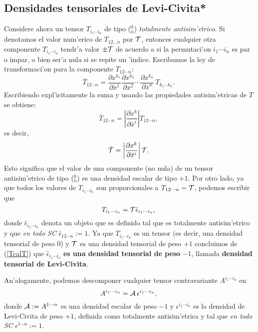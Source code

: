  \subsection{Densidades tensoriales de Levi-Civita*}
 Considere ahora un tensor $T_{i_1\cdots i_n}$ de tipo ($_n^0$)
 \textit{totalmente
 antisim'etrico}. Si denotamos el valor num'erico de $T_{12\dots n}$ por
 ${\cal T}$, entonces cualquier otra componente $T_{i_1\cdots i_n}$ tendr'a
 valor
 $\pm{\cal T}$ de acuerdo a si la permutaci'on $i_1\cdots i_n$ es par o
 impar, o
 bien ser'a nula si se repite un 'indice. Escribamos la ley de transformaci'on
 para la componente $T_{12\cdots n}$:
 \begin{equation}
 \bar{T}_{12\cdots n}=\frac{\partial
 x^{k_1}}{\partial\bar{x}^1}\frac{\partial
 x^{k_2}}{\partial\bar{x}^2}\cdots \frac{\partial x^{k_n}}{\partial\bar
 {x}^n}\,T_{k_1\cdots k_n}. \label{den8}%
 \end{equation}
 Escribiendo expl'icitamente la suma y usando las propiedades
 antisim'etricas de $T$ se obtiene:
 \begin{equation}
 \bar{T}_{12\cdots n}=\left| \frac{\partial x^k }{\partial\bar{x}^i }\right|
 T_{12\cdots n}, \label{den9}%
 \end{equation}
 es decir,
 \begin{equation}
 \bar{{\cal T}}=\left| \frac{\partial x^k }{\partial\bar{x}^i }\right| {\cal
 T}.
 \label{den10}%
 \end{equation}
 Esto significa que el valor de una componente (no nula) de un tensor
 antisim'etrico de tipo ($_n^0$) es una densidad escalar de tipo $+1$. Por
 otro lado, ya que todos los valores de $T_{i_1\cdots i_n}$ son
 proporcionales a $T_{12\cdots n}={\cal T}$, podemos escribir que
 \begin{equation}
 T_{i_1\cdots i_n}={\cal T}\hat{\epsilon}_{i_1\cdots i_n},
 \label{TcalT}
 \end{equation}
 donde $\hat{\epsilon}_{i_1\cdots i_n}$ denota un objeto que es definido
 tal que es totalmente antisim'etrico y que \textit{en todo SC}
 $\hat{\epsilon}_{12\cdots n}:=1$. Ya que $T_{i_1\cdots i_n}$ es un tensor
 (es decir, una densidad tensorial de peso $0$) y ${\cal T}$ es una densidad
 tensorial de peso $+1$ concluimos de (\ref{TcalT}) que
 $\hat{\epsilon}_{i_1\cdots i_n}$ \textbf{es una densidad tensorial de
 peso} $-1$, llamada \textbf{densidad tensorial de Levi-Civita}.

 An'alogamente, podemos descomponer cualquier tensor contravariante
 $A^{i_1\cdots i_n}$ en
 \begin{equation}
 A^{i_1\cdots i_n}={\cal A}\,\epsilon^{i_1\cdots i_n}, \label{AcalA}
 \end{equation}
 donde ${\cal A}:=A^{1\cdots n}$ es una densidad escalar de peso $-1$ y
 $\epsilon^{i_1\cdots i_n}$ es la densidad de Levi-Civita de peso $+1$,
 definida como totalmente antisim'etrica y tal que
 \textit{en todo SC} $\epsilon^{1\cdots n}:=1$.

